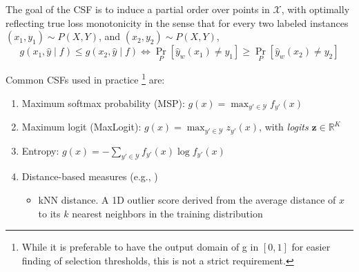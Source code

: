 The goal of the CSF is to induce a partial order over points in $\mathcal{X}$, with optimally reflecting true loss monotonicity in the sense that for every two labeled instances $\left(x_1, y_1\right) \sim P(X, Y)$, and $\left(x_2, y_2\right) \sim P(X, Y)$,
$$
    g\left(x_1, \hat{y} \mid f\right) \leq g\left(x_2, \hat{y} \mid f\right) \Longleftrightarrow \operatorname{Pr}_P\left[\hat{y}_w\left(x_1\right) \neq y_1\right] \geq \operatorname{Pr}_P\left[\hat{y}_w\left(x_2\right) \neq y_2\right]
$$

\noindent Common CSFs used in practice \footnote{While it is preferable to have the output domain of g in $[0,1]$ for easier finding of selection thresholds, this is not a strict requirement.} are:
\begin{enumerate}
    \item Maximum softmax probability (MSP): $g(x) = \max_{y' \in \mathcal{Y}} f_{y'}(x)$
    \item Maximum logit (MaxLogit): $g(x) = \max_{y' \in \mathcal{Y}} z_{y'}(x)$, with \textit{logits} $\mathbf{z} \in \mathbb{R}^K$
    \item Entropy: $g(x) = -\sum_{y' \in \mathcal{Y}} f_{y'}(x) \log f_{y'}(x)$
    \item Distance-based measures (e.g., \cite{fisch2022calibrated})
          \begin{itemize}
              \item kNN distance. A 1D outlier score derived from the average distance of $x$ to its $k$ nearest neighbors in the training distribution
          \end{itemize}
\end{enumerate}

